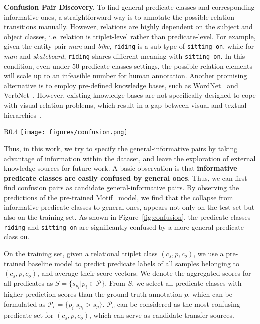 \documentclass[runningheads]{llncs}
\begin{document}
\smallskip
\noindent
\textbf{Confusion Pair Discovery.}
To find general predicate classes and corresponding informative ones, a straightforward way is to annotate the possible relation transitions manually.
However, relations are highly dependent on the subject and object classes, i.e. relation is triplet-level rather than predicate-level.
For example, given the entity pair \textit{man} and \textit{bike}, \texttt{riding} is a sub-type of \texttt{sitting on}, while for \textit{man} and \textit{skateboard}, \texttt{riding} shares different meaning with \texttt{sitting on}.
In this condition, even under 50 predicate classes settings, the possible relation elements will scale up to an infeasible number for human annotation.
Another promising alternative is to employ pre-defined knowledge bases, such as WordNet~\cite{miller1995wordnet} and VerbNet~\cite{kipper2006extending}.
However, existing knowledge bases are not specifically designed to cope with visual relation problems, which result in a gap between visual and textual hierarchies~\cite{wan2020nbdt}.


\begin{wrapfigure}{R}{0.4\textwidth}
\centering
        \texttt{[image: figures/confusion.png]}
        \caption{Confusion matrix of Motif~\cite{zellers2018motif}'s prediction score on all entity pairs in VG training set with the subject \textit{man} and the object \textit{motorcycle}.}
        \label{fig:confusion}
\end{wrapfigure}


Thus, in this work, we try to specify the general-informative pairs by taking advantage of information within the dataset, and leave the exploration of external knowledge sources for future work.
A basic observation is that \textbf{informative predicate classes are easily confused by general ones}.
Thus, we can first find confusion pairs as candidate general-informative pairs.
By observing the predictions of the pre-trained  Motif~\cite{zellers2018motif} model, we find that the collapse from informative predicate classes to general ones, appears not only on the test set but also on the training set.
As shown in Figure~\ref{fig:confusion}, the predicate classes \texttt{riding} and \texttt{sitting on} are significantly confused by a more general predicate class \texttt{on}.

On the training set, given a relational triplet class $(c_s, p, c_o)$, we use a pre-trained baseline model to predict predicate labels of all samples belonging to $(c_s, p, c_o)$, and average their score vectors.
We denote the aggregated scores for all predicates as $S = \{s_{p_i} | p_i \in \mathcal{P} \}$.
From $S$, we select all predicate classes with higher prediction scores than the ground-truth annotation $p$, which can be formulated as $\mathcal{P}_c = \{p_i | s_{p_i}>s_{p}\}$.
$\mathcal{P}_c$ can be considered as the most confusing predicate set for $(c_s, p, c_o)$, which can serve as candidate transfer sources.
\end{document}
